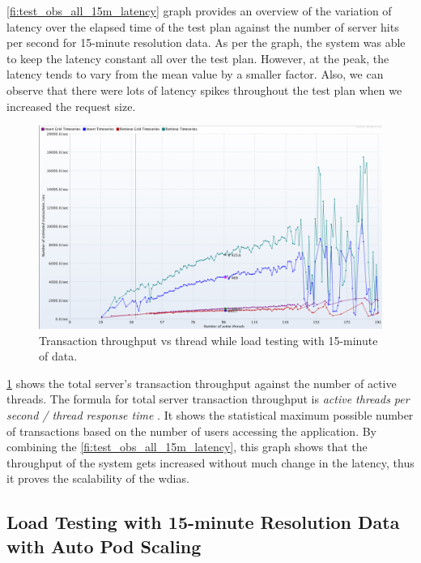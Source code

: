 \cref{fi:test_obs_all_15m_latency} graph provides an overview of the variation of latency over the elapsed time of the test plan against the number of server hits per second for 15-minute resolution data. As per the graph, the system was able to keep the latency constant all over the test plan. However, at the peak, the latency tends to vary from the mean value by a smaller factor. Also, we can observe that there were lots of latency spikes throughout the test plan when we increased the request size.

\begin{figure}[htp]
    \centering
    \includegraphics[width=1.0\textwidth]{results/obs/all/obs_all_15m_transaction_throughtput_vs_threads.png}
    \caption{Transaction throughput vs thread while load testing with 15-minute of data.}
    \label{fi:test_obs_all_15m_throughtput}
\end{figure}

\cref{fi:test_obs_all_15m_throughtput} shows the total server's transaction throughput against the number of active threads.
The formula for total server transaction throughput is \emph{active threads per second / thread response time} \cite{ApacheSoftwareFoundationJMeter:Plugin}.
It shows the statistical maximum possible number of transactions based on the number of users accessing the application.
By combining the \cref{fi:test_obs_all_15m_latency}, this graph shows that the throughput of the system gets increased without much change in the latency, thus it proves the scalability of the \acrshort{wdias}.


\subsection{Load Testing with 15-minute Resolution Data with Auto Pod Scaling}
\label{subse:obs_test_plan_all_auto_15min}

